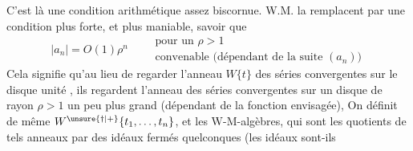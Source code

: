 
C'est là une condition  arithmétique assez biscornue. W.M. la remplacent par une condition plus forte, et plus maniable, savoir que
\[
|a_n|=O(1)\rho^n
\qquad
\begin{gathered}
\text{pour un }\rho>1\\
\text{convenable (dépendant de la suite }(a_n)\text{)}
\end{gathered}
\]
Cela signifie qu'au lieu de regarder l'anneau $W\{t\}$ des séries convergentes sur le disque unité , ils regardent l'anneau  des séries convergentes sur un disque de rayon $\rho>1$  un peu plus grand (dépendant de la fonction envisagée), On définit de même $W^{\unsure{\dagger|+}}\{t_1,\ldots,t_n\}$, et les  W-M-algèbres,  qui sont les quotients de tels anneaux par des idéaux  fermés quelconques  (les idéaux sont-ils


